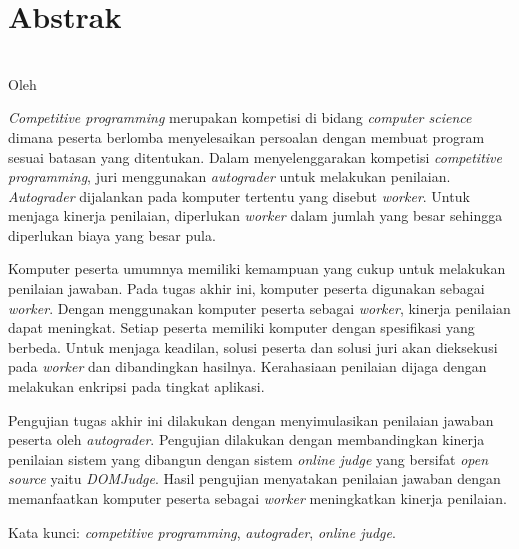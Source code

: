 \clearpage

\chapter*{Abstrak}

\begin{center}
    \textbf{\large {\MakeUppercase{\thetitle}}} \\
    \normalsize Oleh \theauthor
\end{center}

\par \textit{Competitive programming} merupakan kompetisi di bidang \textit{computer science} dimana peserta berlomba menyelesaikan persoalan dengan membuat program sesuai batasan yang ditentukan. Dalam menyelenggarakan kompetisi \textit{competitive programming}, juri menggunakan \textit{autograder} untuk melakukan penilaian. \textit{Autograder} dijalankan pada komputer tertentu yang disebut \textit{worker}. Untuk menjaga kinerja penilaian, diperlukan \textit{worker} dalam jumlah yang besar sehingga diperlukan biaya yang besar pula. 

\par Komputer peserta umumnya memiliki kemampuan yang cukup untuk melakukan penilaian jawaban. Pada tugas akhir ini, komputer peserta digunakan sebagai \textit{worker}. Dengan menggunakan komputer peserta sebagai \textit{worker}, kinerja penilaian dapat meningkat. Setiap peserta memiliki komputer dengan spesifikasi yang berbeda. Untuk menjaga keadilan, solusi peserta dan solusi juri akan dieksekusi pada \textit{worker} dan dibandingkan hasilnya. Kerahasiaan penilaian dijaga dengan melakukan enkripsi pada tingkat aplikasi.

\par Pengujian tugas akhir ini dilakukan dengan menyimulasikan penilaian jawaban peserta oleh \textit{autograder}. Pengujian dilakukan dengan membandingkan kinerja penilaian sistem yang dibangun dengan sistem \textit{online judge} yang bersifat \textit{open source} yaitu \textit{DOMJudge}. Hasil pengujian menyatakan penilaian jawaban dengan memanfaatkan komputer peserta sebagai \textit{worker} meningkatkan kinerja penilaian.

\par Kata kunci: \textit{competitive programming}, \textit{autograder}, \textit{online judge}.

\clearpage